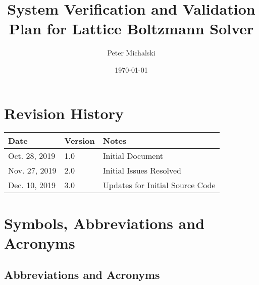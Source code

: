 \documentclass[12pt, titlepage]{article}
\newcommand{\famname}{Lattice Boltzmann Solver}
\begin{document}
\title{System Verification and Validation Plan for \famname} 
\author{Peter Michalski}
\date{\today}
	
\maketitle


\section{Revision History}

\begin{tabularx}{\textwidth}{p{4cm}p{2cm}X}
\toprule {\bf Date} & {\bf Version} & {\bf Notes}\\
\midrule
Oct. 28, 2019 & 1.0 & Initial Document\\
Nov. 27, 2019 & 2.0 & Initial Issues Resolved\\
Dec. 10, 2019 & 3.0 & Updates for Initial Source Code\\
\bottomrule
\end{tabularx}

\newpage

\tableofcontents

\newpage

\listoftables

\newpage

\section{Symbols, Abbreviations and Acronyms}

\subsection{Abbreviations and Acronyms}
\end{document}
